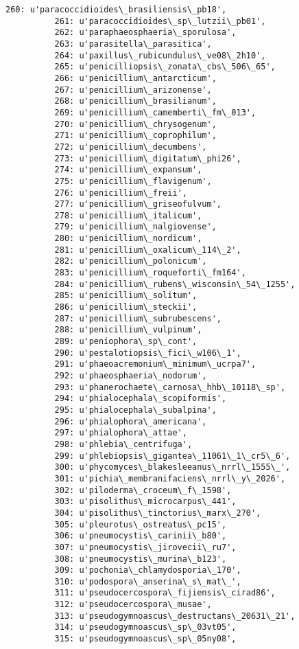 \documentclass[11pt]{article}
\begin{document}
\begin{Verbatim}[commandchars=\\\{\}]
          260: u'paracoccidioides\_brasiliensis\_pb18',
          261: u'paracoccidioides\_sp\_lutzii\_pb01',
          262: u'paraphaeosphaeria\_sporulosa',
          263: u'parasitella\_parasitica',
          264: u'paxillus\_rubicundulus\_ve08\_2h10',
          265: u'penicilliopsis\_zonata\_cbs\_506\_65',
          266: u'penicillium\_antarcticum',
          267: u'penicillium\_arizonense',
          268: u'penicillium\_brasilianum',
          269: u'penicillium\_camemberti\_fm\_013',
          270: u'penicillium\_chrysogenum',
          271: u'penicillium\_coprophilum',
          272: u'penicillium\_decumbens',
          273: u'penicillium\_digitatum\_phi26',
          274: u'penicillium\_expansum',
          275: u'penicillium\_flavigenum',
          276: u'penicillium\_freii',
          277: u'penicillium\_griseofulvum',
          278: u'penicillium\_italicum',
          279: u'penicillium\_nalgiovense',
          280: u'penicillium\_nordicum',
          281: u'penicillium\_oxalicum\_114\_2',
          282: u'penicillium\_polonicum',
          283: u'penicillium\_roqueforti\_fm164',
          284: u'penicillium\_rubens\_wisconsin\_54\_1255',
          285: u'penicillium\_solitum',
          286: u'penicillium\_steckii',
          287: u'penicillium\_subrubescens',
          288: u'penicillium\_vulpinum',
          289: u'peniophora\_sp\_cont',
          290: u'pestalotiopsis\_fici\_w106\_1',
          291: u'phaeoacremonium\_minimum\_ucrpa7',
          292: u'phaeosphaeria\_nodorum',
          293: u'phanerochaete\_carnosa\_hhb\_10118\_sp',
          294: u'phialocephala\_scopiformis',
          295: u'phialocephala\_subalpina',
          296: u'phialophora\_americana',
          297: u'phialophora\_attae',
          298: u'phlebia\_centrifuga',
          299: u'phlebiopsis\_gigantea\_11061\_1\_cr5\_6',
          300: u'phycomyces\_blakesleeanus\_nrrl\_1555\_',
          301: u'pichia\_membranifaciens\_nrrl\_y\_2026',
          302: u'piloderma\_croceum\_f\_1598',
          303: u'pisolithus\_microcarpus\_441',
          304: u'pisolithus\_tinctorius\_marx\_270',
          305: u'pleurotus\_ostreatus\_pc15',
          306: u'pneumocystis\_carinii\_b80',
          307: u'pneumocystis\_jirovecii\_ru7',
          308: u'pneumocystis\_murina\_b123',
          309: u'pochonia\_chlamydosporia\_170',
          310: u'podospora\_anserina\_s\_mat\_',
          311: u'pseudocercospora\_fijiensis\_cirad86',
          312: u'pseudocercospora\_musae',
          313: u'pseudogymnoascus\_destructans\_20631\_21',
          314: u'pseudogymnoascus\_sp\_03vt05',
          315: u'pseudogymnoascus\_sp\_05ny08',

\end{Verbatim}
\end{document}
